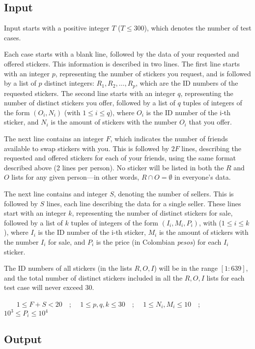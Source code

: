 \documentclass[12pt]{article}
\begin{document}
\subsection{Input}\label{input}

Input starts with a positive integer $T$ ($T \leq 300$), which denotes
the number of test cases.

Each case starts with a blank line, followed by the data of your
requested and offered stickers. This information is described in two
lines. The first line starts with an integer $p$, representing the
number of stickers you request, and is followed by a list of $p$
distinct integers: $R_1, R_2, \ldots, R_p$, which are the ID numbers of
the requested stickers. The second line starts with an integer $q$,
representing the number of distinct stickers you offer, followed by a
list of $q$ tuples of integers of the form $(O_i,N_i)$ (with
$1 \leq i \leq q$), where $O_i$ is the ID number of the i-th sticker,
and $N_i$ is the amount of stickers with the number $O_i$ that you
offer.

The next line contains an integer $F$, which indicates the number of
friends available to swap stickers with you. This is followed by $2F$
lines, describing the requested and offered stickers for each of your
friends, using the same format described above (2 lines per person). No
sticker will be listed in both the $R$ and $O$ lists for any given
person---in other words, $R \cap O = \emptyset$ in everyone's data.

The next line contains and integer $S$, denoting the number of sellers.
This is followed by $S$ lines, each line describing the data for a
single seller. These lines start with an integer $k$, representing the
number of distinct stickers for sale, followed by a list of $k$ tuples
of integers of the form $(I_i,M_i,P_i)$, with ($1 \leq i \leq k$), where
$I_i$ is the ID number of the i-th sticker, $M_i$ is the amount of
stickers with the number $I_i$ for sale, and $P_i$ is the price (in
Colombian \emph{pesos}) for each $I_i$ sticker.

The ID numbers of all stickers (in the lists $R, O, I$) will be in the
range $[1:639]$, and the total number of distinct stickers included in
all the $R, O, I$ lists for each test case will never exceed 30.

~~~ $1 \leq F+S < 20$~~; ~~$1 \leq p, q, k \leq 30$~~;
~~$1 \leq N_i, M_i \leq 10$~~; ~~$10^3 \leq P_i \leq 10^4$

\subsection{Output}\label{output}
\end{document}

